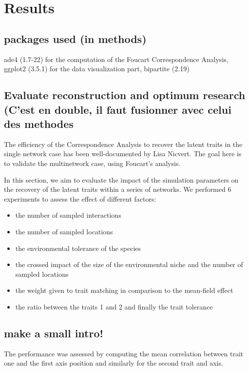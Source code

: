 \section{Results}

\subsection{packages used (in methods)}

ade4 (1.7-22) for the computation of the Foucart Correspondence Analysis, ggplot2 (3.5.1) for the data visualization part, bipartite (2.19)

\subsection{Evaluate reconstruction and optimum research (C'est en double, il faut fusionner avec celui des methodes}

The efficiency of the Correspondence Analysis to recover the latent traits in the single network case has been well-documented by Lisa Nicvert. The goal here is to validate the multinetwork case, using Foucart's analysis.

In this section, we aim to evaluate the impact of the simulation parameters on the recovery of the latent traits within a series of networks. We performed 6 experiments to assess the effect of different factors:
\begin{itemize}
    \item the number of sampled interactions
    \item the number of sampled locations
    \item the environmental tolerance of the species
    \item the crossed impact of the size of the environmental niche and the number of sampled locations
    \item the weight given to trait matching in comparison to the mean-field effect
    \item the ratio between the traits 1 and 2 and finally the trait tolerance
\end{itemize}







\subsection{make a small intro!}

The performance was assessed by computing the mean correlation between trait one and the first axis position and similarly for the second trait and axis.



